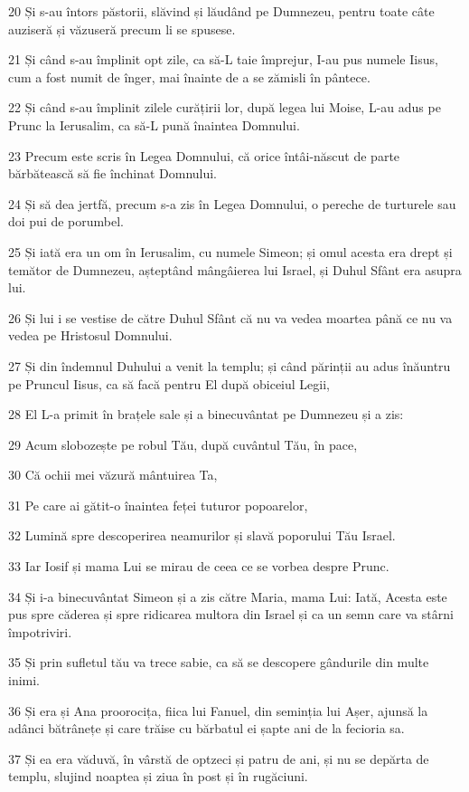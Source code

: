 \par 20 Și s-au întors păstorii, slăvind și lăudând pe Dumnezeu, pentru toate câte auziseră și văzuseră precum li se spusese.
\par 21 Și când s-au împlinit opt zile, ca să-L taie împrejur, I-au pus numele Iisus, cum a fost numit de înger, mai înainte de a se zămisli în pântece.
\par 22 Și când s-au împlinit zilele curățirii lor, după legea lui Moise, L-au adus pe Prunc la Ierusalim, ca să-L pună înaintea Domnului.
\par 23 Precum este scris în Legea Domnului, că orice întâi-născut de parte bărbătească să fie închinat Domnului.
\par 24 Și să dea jertfă, precum s-a zis în Legea Domnului, o pereche de turturele sau doi pui de porumbel.
\par 25 Și iată era un om în Ierusalim, cu numele Simeon; și omul acesta era drept și temător de Dumnezeu, așteptând mângâierea lui Israel, și Duhul Sfânt era asupra lui.
\par 26 Și lui i se vestise de către Duhul Sfânt că nu va vedea moartea până ce nu va vedea pe Hristosul Domnului.
\par 27 Și din îndemnul Duhului a venit la templu; și când părinții au adus înăuntru pe Pruncul Iisus, ca să facă pentru El după obiceiul Legii,
\par 28 El L-a primit în brațele sale și a binecuvântat pe Dumnezeu și a zis:
\par 29 Acum slobozește pe robul Tău, după cuvântul Tău, în pace,
\par 30 Că ochii mei văzură mântuirea Ta,
\par 31 Pe care ai gătit-o înaintea feței tuturor popoarelor,
\par 32 Lumină spre descoperirea neamurilor și slavă poporului Tău Israel.
\par 33 Iar Iosif și mama Lui se mirau de ceea ce se vorbea despre Prunc.
\par 34 Și i-a binecuvântat Simeon și a zis către Maria, mama Lui: Iată, Acesta este pus spre căderea și spre ridicarea multora din Israel și ca un semn care va stârni împotriviri.
\par 35 Și prin sufletul tău va trece sabie, ca să se descopere gândurile din multe inimi.
\par 36 Și era și Ana proorocița, fiica lui Fanuel, din seminția lui Așer, ajunsă la adânci bătrânețe și care trăise cu bărbatul ei șapte ani de la fecioria sa.
\par 37 Și ea era văduvă, în vârstă de optzeci și patru de ani, și nu se depărta de templu, slujind noaptea și ziua în post și în rugăciuni.
